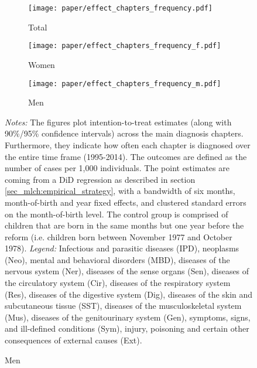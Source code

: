 \begin{landscape}
	\vspace*{\fill}
	\begin{figure}[H]\centering
		\caption{Intention-to-treat effects across main diagnosis chapters}\label{fig_mlch: DD_across_main chapters}
		\begin{subfigure}[h]{0.31\linewidth}\centering\caption{Total}
			\texttt{[image: paper/effect\_chapters\_frequency.pdf]}
		\end{subfigure}
		\begin{subfigure}[h]{0.31\linewidth}\centering\caption{Women}
			\texttt{[image: paper/effect\_chapters\_frequency\_f.pdf]}
		\end{subfigure}
		\begin{subfigure}[h]{0.31\linewidth}\centering\caption{Men}
			\texttt{[image: paper/effect\_chapters\_frequency\_m.pdf]}
		\end{subfigure}
		\scriptsize
		\begin{minipage}{\linewidth}
			\emph{Notes:} The figures plot intention-to-treat estimates (along with 90\%/95\% confidence intervals) across the main diagnosis chapters. Furthermore, they indicate how often each chapter is diagnosed over the entire time frame (1995-2014). The outcomes are defined as the number of cases per 1,000 individuals. The point estimates are coming from a DiD regression as described in section \ref{sec_mlch:empirical_strategy}, with a bandwidth of six months, month-of-birth and year fixed effects, and clustered standard errors on the month-of-birth level. The control group is comprised of children that are born in the same months but one year before the reform (i.e. children born between November 1977 and October 1978). \newline
			\emph{Legend:} Infectious and parasitic diseases (IPD), neoplasms (Neo), mental and behavioral disorders (MBD), diseases of the nervous system (Ner), diseases of the sense organs (Sen), diseases of the circulatory system (Cir), diseases of the respiratory system (Res), diseases of the digestive system (Dig), diseases of the skin and subcutaneous tissue (SST), diseases of the musculoskeletal system (Mus), diseases of the genitourinary system (Gen), symptoms, signs, and ill-defined conditions (Sym), injury, poisoning and certain other consequences of external causes (Ext).
			
		\end{minipage}
	\end{figure}
	\vspace*{\fill}\clearpage
\end{landscape}

